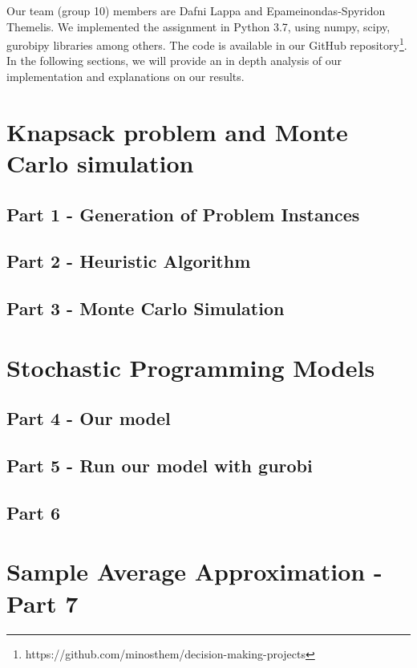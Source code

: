 \documentclass[12pt]{article}
\begin{document}
	Our team (group 10) members are Dafni Lappa and Epameinondas-Spyridon Themelis. We implemented the assignment in Python 3.7, using numpy, scipy, gurobipy libraries among others. The code is available in our GitHub repository\footnote{https://github.com/minosthem/decision-making-projects}. In the following sections, we will provide an in depth analysis of our implementation and explanations on our results.

    \section{Knapsack problem and Monte Carlo simulation}
    
    \subsection{Part 1 - Generation of Problem Instances}

    \subsection{Part 2 - Heuristic Algorithm}
    
    \subsection{Part 3 - Monte Carlo Simulation}
    
    \section{Stochastic Programming Models}
    
    \subsection{Part 4 - Our model}
    
    \subsection{Part 5 - Run our model with gurobi}
    
    \subsection{Part 6}
    
    \section{Sample Average Approximation - Part 7}
    
\end{document}
